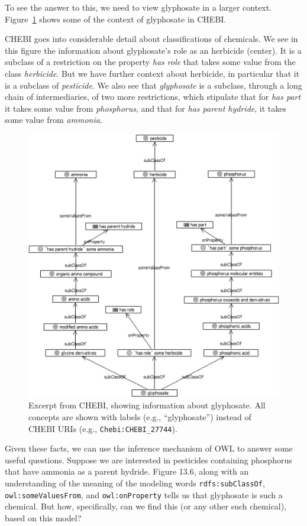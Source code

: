To see the answer to this, we need to view glyphosate in a larger
context. Figure~\ref{fig:ch14.06} shows some of the context of glyphosate in CHEBI.

CHEBI goes into considerable detail about classifications of chemicals.
We see in this figure the information about glyphosate's role as an
herbicide (center). It is a subclass of a restriction on the property
\textit{has role} that takes some value from the class \textit{herbicide}. But we have
further context about herbicide, in particular that it is a subclass of
\textit{pesticide}. We also see that \textit{glyphosate} is a subclass, through a long
chain of intermediaries, of two more restrictions, which stipulate that
for\textit{ has part} it takes some value from \textit{phosphorus}, and that for\textit{ has
parent hydride}, it takes some value from \textit{ammonia}.


\begin{figure}
\centering
\includegraphics[width=5in]{media/ch14/f14-06.png}
\caption{Excerpt from CHEBI, showing information about glyphosate. All concepts
are shown with labels (e.g., ``glyphosate'') instead of CHEBI URIs
(e.g., \texttt{Chebi:CHEBI\_27744}).
}
\label{fig:ch14.06}
\end{figure}

Given these facts, we can use the inference mechanism of OWL to answer
some useful questions. Suppose we are interested in pesticides
containing phosphorus that have ammonia as a parent hydride. Figure
13.6, along with an understanding of the meaning of the modeling words
\texttt{rdfs:subClassOf}, \texttt{owl:someValuesFrom}, and \texttt{owl:onProperty} tells us that
glyphosate is such a chemical. But how, specifically, can we find this
(or any other such chemical), based on this model?

